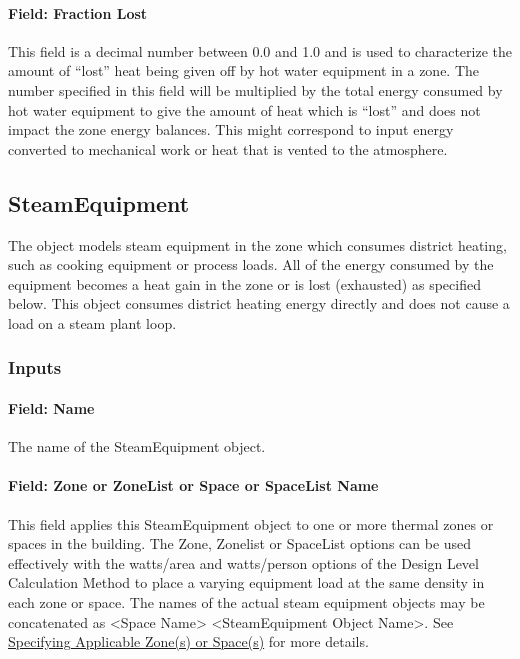 \paragraph{Field: Fraction Lost}\label{field-fraction-lost-2-hw-definition}

This field is a decimal number between 0.0 and 1.0 and is used to characterize the amount of ``lost'' heat being given off by hot water equipment in a zone. The number specified in this field will be multiplied by the total energy consumed by hot water equipment to give the amount of heat which is ``lost'' and does not impact the zone energy balances. This might correspond to input energy converted to mechanical work or heat that is vented to the atmosphere.

\subsection{SteamEquipment}\label{steamequipment}

The object models steam equipment in the zone which consumes district heating, such as cooking equipment or process loads. All of the energy consumed by the equipment becomes a heat gain in the zone or is lost (exhausted) as specified below. This object consumes district heating energy directly and does not cause a load on a steam plant loop.

\subsubsection{Inputs}\label{inputs-6-012}

\paragraph{Field: Name}\label{field-name-6-009}

The name of the SteamEquipment object.

\paragraph{Field: Zone or ZoneList or Space or SpaceList Name}\label{steameq-field-zone-or-zonelist-name-000}

This field applies this SteamEquipment object to one or more thermal zones or spaces in the building. The Zone, Zonelist or SpaceList options can be used effectively with the watts/area and watts/person options of the Design Level Calculation Method to place a varying equipment load at the same density in each zone or space. The names of the actual steam equipment objects may be concatenated as \textless{}Space Name\textgreater{} \textless{}SteamEquipment Object Name\textgreater{}. See \hyperref[specifying-applicable-zones-or-spaces]{Specifying Applicable Zone(s) or Space(s)} for more details.

